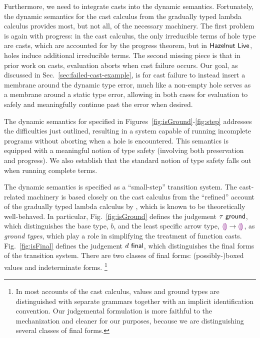 Furthermore, we need to integrate casts into the dynamic semantics. 
Fortunately, the dynamic semantics for the cast calculus from the gradually typed lambda calculus provides most, but not all, of the necessary machinery. 
The first problem is again with progress: in the cast calculus, the only irreducible terms of hole type are casts, which are accounted for by the progress theorem, but in $\textsf{Hazelnut Live}$, holes induce additional irreducible terms. 
The second missing piece is that in prior work on casts, evaluation aborts when cast failure occurs. 
Our goal, as discussed in Sec.~\ref{sec:failed-cast-example}, is for cast failure to instead insert a membrane around the dynamic type error, 
much like a non-empty hole serves as a membrane around a static type error, 
allowing in both cases for evaluation to safely and meaningfully continue past the error when desired.

The dynamic semantics for \HazelnutLive specified in Figures~\ref{fig:isGround}-\ref{fig:step} addresses the difficulties just outlined, 
resulting in a system capable of running incomplete programs without aborting when a hole is encountered. 
This semantics is equipped with a meaningful notion of type safety (involving both preservation and progress). 
We also establish that the standard notion of type safety falls out when running complete terms.

The dynamic semantics is specified as a ``small-step'' transition system. 
The cast-related machinery is based closely on the cast calculus from the ``refined'' account of the gradually typed lambda calculus by \citet{DBLP:conf/snapl/SiekVCB15}, which is known to be theoretically well-behaved. 
In particular, Fig.~\ref{fig:isGround} defines the judgement $\tau~\mathsf{ground}$, which distinguishes the base type, $b$, and the least specific arrow type, $\textcolor{violet}{\llparenthesis}\textcolor{violet}{\rrparenthesis} \rightarrow \textcolor{violet}{\llparenthesis}\textcolor{violet}{\rrparenthesis}$, as \emph{ground types}, which play a role in simplifying the treatment of function casts. 
Fig.~\ref{fig:isFinal} defines the judgement $d~\mathsf{final}$, which distinguishes the final forms of the transition system. 
There are two classes of final forms: (possibly-)boxed values and indeterminate forms.%
\footnote{In most accounts of the cast calculus, values and ground types are distinguished with separate grammars together with an implicit identification convention. 
Our judgemental formulation is more faithful to the mechanization and cleaner for our purposes, because we are distinguishing several classes of final forms.}




